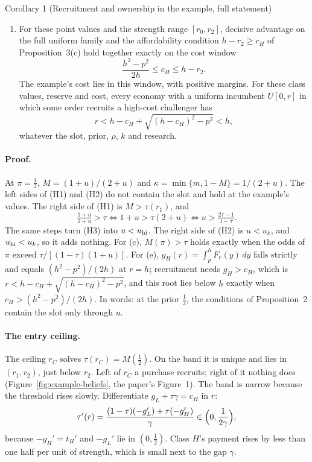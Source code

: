 \begin{paperresult}{Corollary 1 (Recruitment and ownership in the example, full statement)}
\begin{enumerate}[label=(\alph*),leftmargin=2em]
  ownership and class \(H\)'s share of the acquisitions won by the challenger take, at the three strengths, the
  values of Chapter~\ref{app:numbers}.
\item For these point values and the strength range \([r_0,r_2]\), decisive advantage on the full uniform family
  and the affordability condition \(h-r_2\ge c_H\) of Proposition~3(c) hold together exactly on the cost window
  \[
  \frac{h^2-p^2}{2h}\le c_H\le h-r_2 .
  \]
  The example's cost lies in this window, with positive margins. For these class values, reserve and cost, every
  economy with a uniform incumbent \(U[0,r]\) in which some order recruits a high-cost challenger has
  \[
  r<h-c_H+\sqrt{(h-c_H)^2-p^2}<h,
  \]
  whatever the slot, prior, \(\rho\), \(k\) and research.
\end{enumerate}
\end{paperresult}

\paragraph{Proof.} At \(\pi=\tfrac12\), \(M=(1+u)/(2+u)\) and \(\kappa=\min\{m,1-M\}=1/(2+u)\). The left sides of (H1) and
(H2) do not contain the slot and hold at the example's values. The right side of (H1) is \(M>\tau(r_1)\), and
\[
\tfrac{1+u}{2+u}>\tau\iff 1+u>\tau(2+u)\iff u>\tfrac{2\tau-1}{1-\tau}.
\]
The same steps turn (H3) into \(u<u_{\rm hi}\). The right side of (H2) is \(u<u_k\), and \(u_{\rm hi}<u_k\), so it adds
nothing. For (c), \(M(\pi)>\tau\) holds exactly when the odds of \(\pi\) exceed \(\tau/[(1-\tau)(1+u)]\). For (e),
\(g_H(r)=\int_p^hF_r(y)\,dy\) falls strictly and equals \((h^2-p^2)/(2h)\) at \(r=h\); recruitment needs \(g_H>c_H\),
which is \(r<h-c_H+\sqrt{(h-c_H)^2-p^2}\), and this root lies below \(h\) exactly when \(c_H>(h^2-p^2)/(2h)\).
In words: at the prior \(\tfrac12\), the conditions of Proposition~2 contain the slot only through \(u\).

\paragraph{The entry ceiling.} The ceiling \(r_C\) solves \(\tau(r_C)=M(\tfrac12)\). On the band it is unique and lies
in \((r_1,r_2)\), just below \(r_2\). Left of \(r_C\) a purchase recruits; right of it nothing does
(Figure~\ref{fig:example-beliefs}, the paper's Figure~1). The band is narrow because the threshold rises slowly.
Differentiate \(g_L+\tau\gamma=c_H\) in \(r\):
\[
\tau'(r)=\frac{(1-\tau)(-g_L')+\tau(-g_H')}{\gamma}\in\Bigl(0,\frac{1}{2\gamma}\Bigr),
\]
because \(-g_H'=t_H'\) and \(-g_L'\) lie in \((0,\tfrac12)\). Class \(H\)'s payment rises by less than one half per unit
of strength, which is small next to the gap \(\gamma\).

